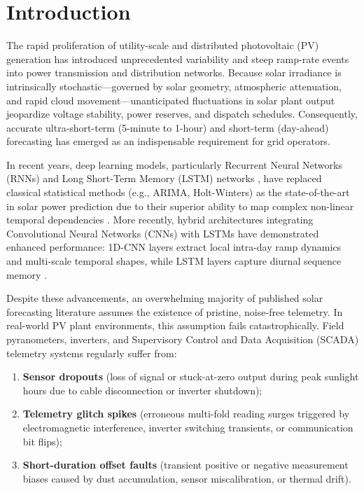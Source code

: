 \documentclass[conference]{IEEEtran}
\begin{document}
\section{Introduction}

The rapid proliferation of utility-scale and distributed photovoltaic (PV) generation has introduced unprecedented variability and steep ramp-rate events into power transmission and distribution networks. Because solar irradiance is intrinsically stochastic---governed by solar geometry, atmospheric attenuation, and rapid cloud movement---unanticipated fluctuations in solar plant output jeopardize voltage stability, power reserves, and dispatch schedules. Consequently, accurate ultra-short-term (5-minute to 1-hour) and short-term (day-ahead) forecasting has emerged as an indispensable requirement for grid operators.

In recent years, deep learning models, particularly Recurrent Neural Networks (RNNs) and Long Short-Term Memory (LSTM) networks \cite{hochreiter1997lstm}, have replaced classical statistical methods (e.g., ARIMA, Holt-Winters) as the state-of-the-art in solar power prediction due to their superior ability to map complex non-linear temporal dependencies \cite{mellit2021deep, sobri2018review}. More recently, hybrid architectures integrating Convolutional Neural Networks (CNNs) with LSTMs have demonstrated enhanced performance: 1D-CNN layers extract local intra-day ramp dynamics and multi-scale temporal shapes, while LSTM layers capture diurnal sequence memory \cite{zang2020cnnlstm, obiora2021hourly, qu2021dayahead, boucetta2024enhanced}.

Despite these advancements, an overwhelming majority of published solar forecasting literature assumes the existence of pristine, noise-free telemetry. In real-world PV plant environments, this assumption fails catastrophically. Field pyranometers, inverters, and Supervisory Control and Data Acquisition (SCADA) telemetry systems regularly suffer from:
\begin{enumerate}
    \item \textbf{Sensor dropouts} (loss of signal or stuck-at-zero output during peak sunlight hours due to cable disconnection or inverter shutdown);
    \item \textbf{Telemetry glitch spikes} (erroneous multi-fold reading surges triggered by electromagnetic interference, inverter switching transients, or communication bit flips);
    \item \textbf{Short-duration offset faults} (transient positive or negative measurement biases caused by dust accumulation, sensor miscalibration, or thermal drift).
\end{enumerate}
\end{document}
